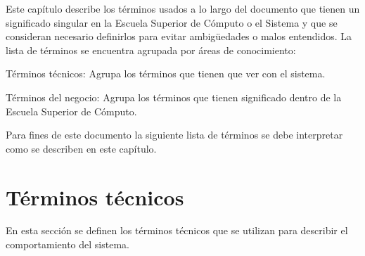 \label{sec:glosario}
    Este capítulo describe los términos usados a lo largo del documento que tienen un significado singular en la Escuela Superior de Cómputo o el Sistema y que se consideran necesario definirlos para evitar ambigüedades o malos entendidos.
    La lista de términos se encuentra agrupada por áreas de conocimiento:
\begin{Citemize}
    \item Términos técnicos: Agrupa los términos que tienen que ver con el sistema.
    \item Términos del negocio: Agrupa los términos que tienen significado dentro de la Escuela Superior de Cómputo.
\end{Citemize}

    Para fines de este documento la siguiente lista de términos se debe interpretar como se describen en este capítulo.

   
\section{Términos técnicos}
\label{gls:terminosTecnicos}

  En esta sección se definen los términos técnicos que se utilizan para describir el comportamiento del sistema.
  

